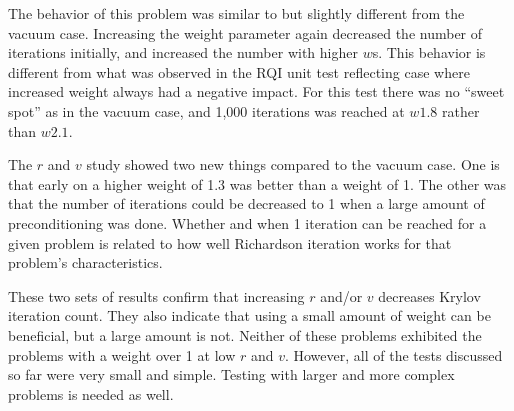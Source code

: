 The behavior of this problem was similar to but slightly different from the vacuum case. Increasing the weight parameter again decreased the number of iterations initially, and increased the number with higher $w$s. This behavior is different from what was observed in the RQI unit test reflecting case where increased weight always had a negative impact. For this test there was no ``sweet spot'' as in the vacuum case, and 1,000 iterations was reached at $w1.8$ rather than $w2.1$.

The $r$ and $v$ study showed two new things compared to the vacuum case. One is that early on a higher weight of 1.3 was better than a weight of 1. The other was that the number of iterations could be decreased to 1 when a large amount of preconditioning was done. Whether and when 1 iteration can be reached for a given problem is related to how well Richardson iteration works for that problem's characteristics. 

These two sets of results confirm that increasing $r$ and/or $v$ decreases Krylov iteration count. They also indicate that using a small amount of weight can be beneficial, but a large amount is not. Neither of these problems exhibited the problems with a weight over 1 at low $r$ and $v$. However, all of the tests discussed so far were very small and simple. Testing with larger and more complex problems is needed as well. 

